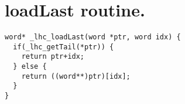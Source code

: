 \documentclass[a4paper,oneside]{memoir}
\begin{document}
\chapter{loadLast routine.}
\label{loadLast_code}

\lstset{language=c}
\begin{lstlisting}
word* _lhc_loadLast(word *ptr, word idx) {
  if(_lhc_getTail(*ptr)) {
    return ptr+idx;
  } else {
    return ((word**)ptr)[idx];
  }
}
\end{lstlisting}

%
\end{document}
